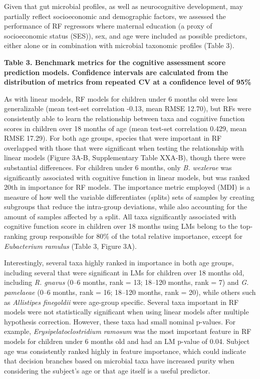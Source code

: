 Given that gut microbial profiles, as well as neurocognitive
development, may partially reflect socioeconomic and demographic
factors, we assessed the performance of RF regressors where maternal
education (a proxy of socioeconomic status (SES)), sex, and age were
included as possible predictors, either alone or in combination with
microbial taxonomic profiles (Table 3).

\textbf{Table 3. Benchmark metrics for the cognitive assessment score
prediction models. Confidence intervals are calculated from the
distribution of metrics from repeated CV at a confidence level of 95\%}


As with linear models, RF models for children under 6 months old were
less generalizable (mean test-set correlation -0.13, mean RMSE 12.70),
but RFs were consistently able to learn the relationship between taxa
and cognitive function scores in children over 18 months of age (mean
test-set correlation 0.429, mean RMSE 17.29). For both age groups,
species that were important in RF overlapped with those that were
significant when testing the relationship with linear models (Figure
3A-B, Supplementary Table XXA-B), though there were substantial
differences. For children under 6 months, only \emph{B. wexlerae} was
significantly associated with cognitive function in linear models, but
was ranked 20th in importance for RF models. The importance metric
employed (MDI) is a measure of how well the variable differentiates
(splits) sets of samples by creating subgroups that reduce the
intra-group deviations, while also accounting for the amount of samples
affected by a split. All taxa significantly associated with cognitive
function score in children over 18 months using LMs belong to the
top-ranking group responsible for 80\% of the total relative importance,
except for \emph{Eubacterium ramulus} (Table 3, Figure 3A).

Interestingly, several taxa highly ranked in importance in both age
groups, including several that were significant in LMs for children over
18 months old, including \emph{R. gnavus} (0--6 months, rank = 13;
18--120 months, rank = 7) and \emph{G. pamelaeae} (0--6 months, rank =
16; 18--120 months, rank = 20), while others such as \emph{Allistipes
finegoldii} were age-group specific. Several taxa important in RF models
were not statistically significant when using linear models after
multiple hypothesis correction. However, these taxa had small nominal
p-values. For example, \emph{Erysipelatoclostridium ramosum} was the
most important feature in RF models for children under 6 months old and
had an LM p-value of 0.04. Subject age was consistently ranked highly in
feature importance, which could indicate that decision branches based on
microbial taxa have increased purity when considering the subject's age
or that age itself is a useful predictor.


